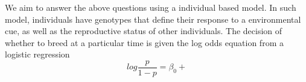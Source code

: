 \documentclass{article}
\begin{document}
	  
	 We aim to answer the above questions using a individual based model. In such model,
	 individuals have genotypes that define their response to a environmental cue, as well 
	 as the reproductive status of other individuals. The decision of whether to breed at a particular time is given the log odds equation from a logistic regression
	 \begin{equation}
		log\frac{p}{1-p}=\beta_0+
	 \end{equation}
	
	
	
	
\end{document}
